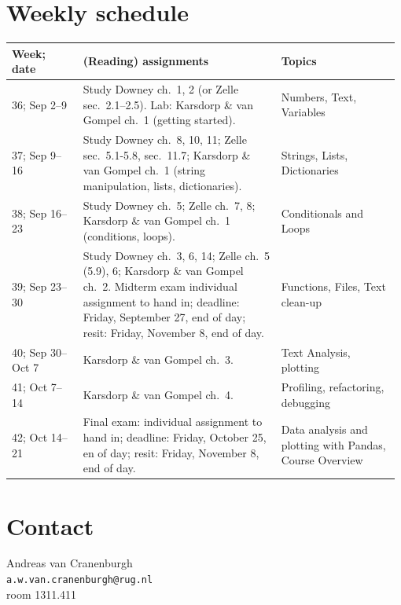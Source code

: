 \documentclass[a4paper,12pt]{article}
\begin{document}
\section{Weekly schedule}\label{sectimetable}
{\raggedright
\begin{longtable}{p{0.18\linewidth} p{0.5\linewidth} p{0.3\linewidth} }
Week; date          & (Reading) assignments & Topics \\ \midrule

36; Sep 2--9 &
    Study Downey ch.\ 1, 2 (or Zelle sec.\ 2.1--2.5).
    Lab: Karsdorp \& van Gompel ch.\ 1 (getting started).
    & Numbers, Text, Variables
    \\

37; Sep 9--16     &
    Study Downey ch.\ 8, 10, 11;
    Zelle sec.\ 5.1-5.8, sec.\ 11.7;
    Karsdorp \& van Gompel ch.\ 1
    (string manipulation, lists,
    dictionaries).
    & Strings, Lists, Dictionaries
    \\

38; Sep 16--23    &
    Study Downey ch.\ 5;
    Zelle ch.\ 7, 8;
    Karsdorp \& van Gompel ch.\ 1 (conditions, loops).
    & Conditionals and Loops
    \\

39; Sep 23--30    &
    Study Downey ch.\ 3, 6, 14;
    Zelle ch.\ 5 (5.9), 6;
    Karsdorp \& van Gompel ch.\ 2.
    Midterm exam individual assignment to hand in;
    deadline: Friday, September 27, end
    of day; resit: Friday, November 8, end
    of day.
    & Functions, Files, Text clean-up
    \\

40; Sep 30--Oct 7 &
    Karsdorp \& van Gompel ch.\ 3.
    & Text Analysis, plotting
    \\

41; Oct 7--14     &
    Karsdorp \& van Gompel ch.\ 4.
    & Profiling, refactoring, debugging 
    \\

42; Oct 14--21    &
    Final exam: individual
    assignment to hand in; deadline:
    Friday, October 25, en of day; resit:
    Friday, November 8, end of day.
    & Data analysis and plotting with Pandas, Course Overview
    \\

\end{longtable}
}

\section{Contact}

Andreas van Cranenburgh\\
\texttt{a.w.van.cranenburgh@rug.nl} \\
room 1311.411
\end{document}
